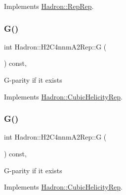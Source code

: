 Implements \mbox{\hyperlink{structHadron_1_1RepRep_a92c8802e5ed7afd7da43ccfd5b7cd92b}{Hadron\+::\+Rep\+Rep}}.

\mbox{\label{structHadron_1_1H2C4nnmA2Rep_af29cadbf7dec6e75cb6df8eed3a4a8ce}} 
\subsubsection{\texorpdfstring{G()}{G()}\hspace{0.1cm}{\footnotesize\ttfamily [1/3]}}
{\footnotesize\ttfamily int Hadron\+::\+H2\+C4nnm\+A2\+Rep\+::G (\begin{DoxyParamCaption}{ }\end{DoxyParamCaption}) const\hspace{0.3cm}{\ttfamily [inline]}, {\ttfamily [virtual]}}

G-\/parity if it exists 

Implements \mbox{\hyperlink{structHadron_1_1CubicHelicityRep_a50689f42be1e6170aa8cf6ad0597018b}{Hadron\+::\+Cubic\+Helicity\+Rep}}.

\mbox{\label{structHadron_1_1H2C4nnmA2Rep_af29cadbf7dec6e75cb6df8eed3a4a8ce}} 
\subsubsection{\texorpdfstring{G()}{G()}\hspace{0.1cm}{\footnotesize\ttfamily [2/3]}}
{\footnotesize\ttfamily int Hadron\+::\+H2\+C4nnm\+A2\+Rep\+::G (\begin{DoxyParamCaption}{ }\end{DoxyParamCaption}) const\hspace{0.3cm}{\ttfamily [inline]}, {\ttfamily [virtual]}}

G-\/parity if it exists 

Implements \mbox{\hyperlink{structHadron_1_1CubicHelicityRep_a50689f42be1e6170aa8cf6ad0597018b}{Hadron\+::\+Cubic\+Helicity\+Rep}}.

\mbox{\label{structHadron_1_1H2C4nnmA2Rep_af29cadbf7dec6e75cb6df8eed3a4a8ce}} 
